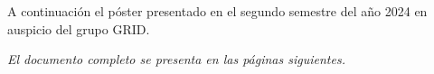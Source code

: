 A continuación el póster presentado en el segundo semestre del año 2024 en auspicio del grupo GRID.
\vfill

\textit{El documento completo se presenta en las páginas siguientes.}



